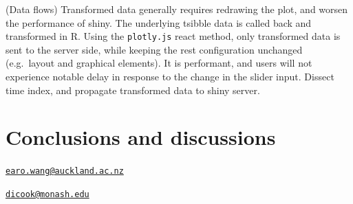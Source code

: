 (Data flows) Transformed data generally requires redrawing the plot, and
worsen the performance of shiny. The underlying tsibble data is called
back and transformed in R. Using the \texttt{plotly.js} react method,
only transformed data is sent to the server side, while keeping the rest
configuration unchanged (e.g.~layout and graphical elements). It is
performant, and users will not experience notable delay in response to
the change in the slider input. Dissect time index, and propagate
transformed data to shiny server.

\hypertarget{conclusions-and-discussions}{%
\section{Conclusions and
discussions}\label{conclusions-and-discussions}}



\address{%
Earo Wang\\
The University of Auckland\\
Department of Statistics\\ The Univerisity of Auckland\\ New Zealand\\
}
\href{mailto:earo.wang@auckland.ac.nz}{\nolinkurl{earo.wang@auckland.ac.nz}}

\address{%
Dianne Cook\\
Monash University\\
Department of Econometrics and Business Statistics\\ Monash
University\\ Australia\\
}
\href{mailto:dicook@monash.edu}{\nolinkurl{dicook@monash.edu}}
